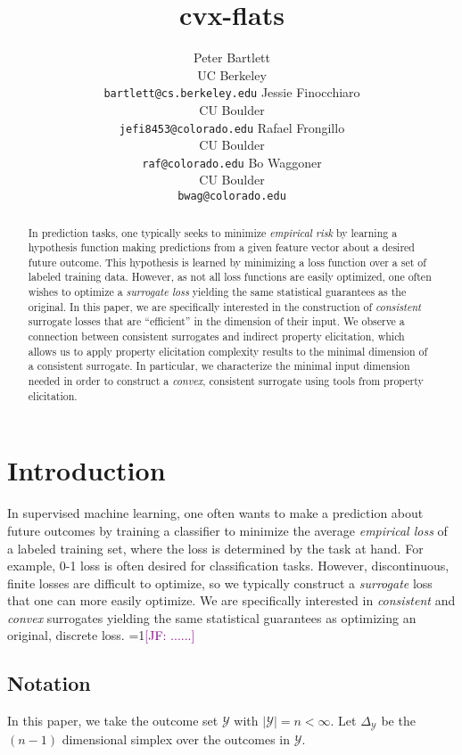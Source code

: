 \documentclass{article}
\title{cvx-flats}
\author{%
	Peter Bartlett\\
	UC Berkeley\\
	\texttt{bartlett@cs.berkeley.edu}
	\And
  Jessie Finocchiaro\\
  CU Boulder\\
  \texttt{jefi8453@colorado.edu} 
  \And
   Rafael Frongillo\\
   CU Boulder\\
   \texttt{raf@colorado.edu} 
   \And
   Bo Waggoner\\
   CU Boulder \\
   \texttt{bwag@colorado.edu} 
}
\newcommand{\Comments}{1}
\newcommand{\mynote}[2]{\ifnum\Comments=1\textcolor{#1}{#2}\fi}
\newcommand{\jessie}[1]{\mynote{purple}{[JF: #1]}}
\newcommand{\simplex}{\Delta_\Y}
\newcommand{\Y}{\mathcal{Y}}
\begin{document}
\maketitle

\begin{abstract}
	In prediction tasks, one typically seeks to minimize \emph{empirical risk} by learning a hypothesis function making predictions from a given feature vector about a desired future outcome.
	This hypothesis is learned by minimizing a loss function over a set of labeled training data.
	However, as not all loss functions are easily optimized, one often wishes to optimize a \emph{surrogate loss} yielding the same statistical guarantees as the original.
	In this paper, we are specifically interested in the construction of \emph{consistent} surrogate losses that are ``efficient'' in the dimension of their input.
	We observe a connection between consistent surrogates and indirect property elicitation, which allows us to apply property elicitation complexity results to the minimal dimension of a consistent surrogate.
	In particular, we characterize the minimal input dimension needed in order to construct a \emph{convex}, consistent surrogate using tools from property elicitation.
\end{abstract}

\section{Introduction}\label{sec:intro}

In supervised machine learning, one often wants to make a prediction about future outcomes by training a classifier to minimize the average \emph{empirical loss} of a labeled training set, where the loss is determined by the task at hand.
For example, 0-1 loss is often desired for classification tasks.
However, discontinuous, finite losses are difficult to optimize, so we typically construct a \emph{surrogate} loss that one can more easily optimize.
We are specifically interested in \emph{consistent} and \emph{convex} surrogates yielding the same statistical guarantees as optimizing an original, discrete loss.
\jessie{......}

\subsection{Notation}
In this paper, we take the outcome set $\Y$ with $|\Y| = n < \infty$.
Let $\simplex$ be the $(n-1)$ dimensional simplex over the outcomes in $\Y$.
\end{document}
